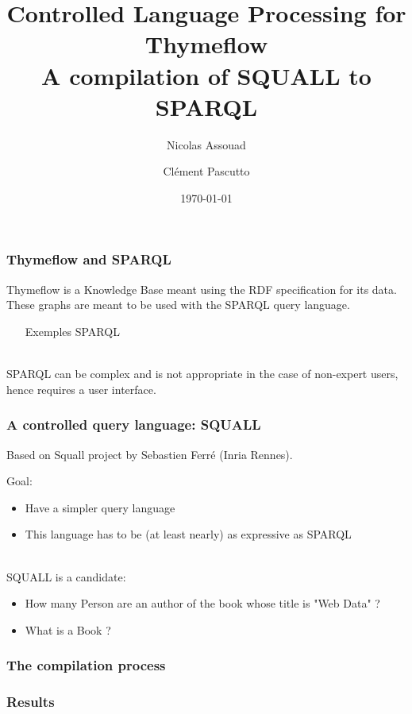 \documentclass{beamer}
\author{Nicolas Assouad\and Cl\'ement Pascutto}
\title[Controlled Language for Thymeflow]{Controlled Language Processing for Thymeflow\\A compilation of SQUALL to SPARQL}
\date{\today}
\begin{document}
  \begin{frame}
	   \titlepage
  \end{frame}

	\begin{frame}
		\frametitle{Thymeflow and SPARQL}
    Thymeflow is a Knowledge Base meant using the RDF specification for its data.
    ~\\
    These graphs are meant to be used with the SPARQL query language.
    \begin{itemize}
      \item [Exemples SPARQL]
    \end{itemize}
    ~\\
    SPARQL can be complex and is not appropriate in the case of non-expert users, hence requires a user interface.
	\end{frame}
  \begin{frame}
    \frametitle{A controlled query language: SQUALL}
    Based on Squall project by Sebastien Ferré (Inria Rennes).

    Goal:
    \begin{itemize}
      \item Have a simpler query language
      \item This language has to be (at least nearly) as expressive as SPARQL
    \end{itemize}
    ~\\
    SQUALL is a candidate:
    \begin{itemize}
      \item How many Person are an author of the book whose title is "Web Data" ?
      \item What is a Book ?
    \end{itemize}
  \end{frame}
  \begin{frame}
    \frametitle{The compilation process}

  \end{frame}
  \begin{frame}
    \frametitle{Results}

  \end{frame}
\end{document}
